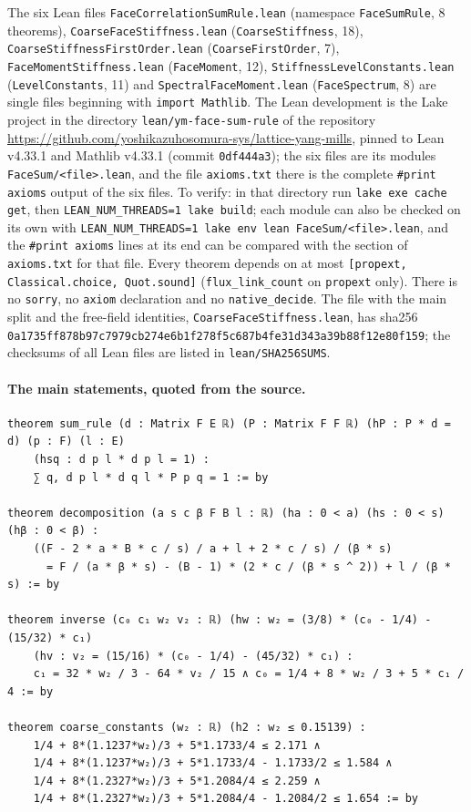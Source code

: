 \documentclass[11pt,a4paper]{article}
\theoremstyle{definition}
\theoremstyle{remark}
\newcommand{\code}[1]{\texttt{#1}}
\begin{document}
{\raggedright The six Lean files \code{FaceCorrelationSumRule.lean} (namespace \code{FaceSumRule}, 8 theorems), \code{CoarseFaceStiffness.lean} (\code{CoarseStiffness}, 18), \code{CoarseStiffnessFirstOrder.lean} (\code{CoarseFirstOrder}, 7), \code{FaceMomentStiffness.lean} (\code{FaceMoment}, 12), \code{StiffnessLevelConstants.lean} (\code{LevelConstants}, 11) and \code{SpectralFaceMoment.lean} (\code{FaceSpectrum}, 8) are single files beginning with \code{import Mathlib}. The Lean development is the Lake project in the directory \code{lean/\allowbreak ym-face-sum-rule} of the repository \url{https://github.com/yoshikazuhosomura-sys/lattice-yang-mills}, pinned to Lean v4.33.1 and Mathlib v4.33.1 (commit \code{0df444a3}); the six files are its modules \code{FaceSum/\allowbreak<file>.lean}, and the file \code{axioms.txt} there is the complete \code{\#print axioms} output of the six files. To verify: in that directory run \code{lake exe cache get}, then \code{LEAN\_NUM\_THREADS=1 lake build}; each module can also be checked on its own with \code{LEAN\_NUM\_THREADS=1 lake env lean FaceSum/\allowbreak<file>.lean}, and the \code{\#print axioms} lines at its end can be compared with the section of \code{axioms.txt} for that file. Every theorem depends on at most \code{[propext, Classical.choice, Quot.sound]} (\code{flux\_link\_count} on \code{propext} only). There is no \code{sorry}, no \code{axiom} declaration and no \code{native\_decide}. The file with the main split and the free-field identities, \code{CoarseFaceStiffness.lean}, has sha256 \code{0a1735ff\allowbreak 878b97c7\allowbreak 979cb274\allowbreak e6b1f278\allowbreak f5c687b4\allowbreak fe31d343\allowbreak a39b88f1\allowbreak 2e80f159}; the checksums of all Lean files are listed in \code{lean/\allowbreak SHA256SUMS}.\par}

\paragraph{The main statements, quoted from the source.}
\begingroup\scriptsize
\begin{verbatim}
theorem sum_rule (d : Matrix F E ℝ) (P : Matrix F F ℝ) (hP : P * d = d) (p : F) (l : E)
    (hsq : d p l * d p l = 1) :
    ∑ q, d p l * d q l * P p q = 1 := by

theorem decomposition (a s c β F B l : ℝ) (ha : 0 < a) (hs : 0 < s) (hβ : 0 < β) :
    ((F - 2 * a * B * c / s) / a + l + 2 * c / s) / (β * s)
      = F / (a * β * s) - (B - 1) * (2 * c / (β * s ^ 2)) + l / (β * s) := by

theorem inverse (c₀ c₁ w₂ v₂ : ℝ) (hw : w₂ = (3/8) * (c₀ - 1/4) - (15/32) * c₁)
    (hv : v₂ = (15/16) * (c₀ - 1/4) - (45/32) * c₁) :
    c₁ = 32 * w₂ / 3 - 64 * v₂ / 15 ∧ c₀ = 1/4 + 8 * w₂ / 3 + 5 * c₁ / 4 := by

theorem coarse_constants (w₂ : ℝ) (h2 : w₂ ≤ 0.15139) :
    1/4 + 8*(1.1237*w₂)/3 + 5*1.1733/4 ≤ 2.171 ∧
    1/4 + 8*(1.1237*w₂)/3 + 5*1.1733/4 - 1.1733/2 ≤ 1.584 ∧
    1/4 + 8*(1.2327*w₂)/3 + 5*1.2084/4 ≤ 2.259 ∧
    1/4 + 8*(1.2327*w₂)/3 + 5*1.2084/4 - 1.2084/2 ≤ 1.654 := by
\end{verbatim}
\endgroup
\end{document}
